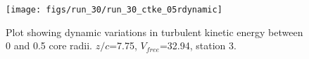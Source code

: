 \begin{figure}[H]
\centering
\texttt{[image: figs/run\_30/run\_30\_ctke\_05rdynamic]}
\caption{Plot showing dynamic variations in turbulent kinetic energy between 0 and 0.5 core radii. $z/c$=7.75, $V_{free}$=32.94, station 3.}
\label{fig:run_30_ctke_05rdynamic}
\end{figure}


